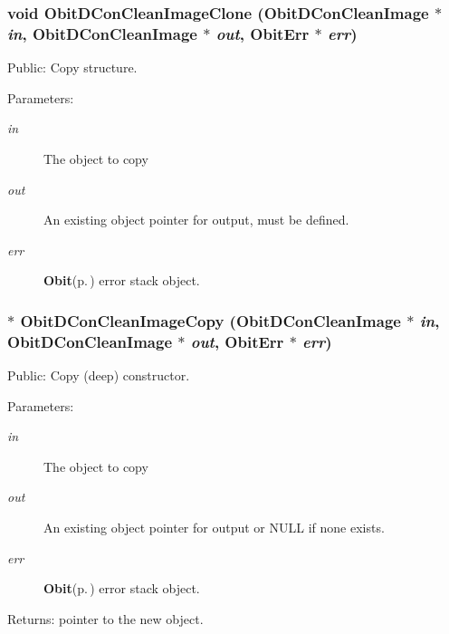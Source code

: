 \subsubsection{\setlength{\rightskip}{0pt plus 5cm}void Obit\-DCon\-Clean\-Image\-Clone ({\bf Obit\-DCon\-Clean\-Image} $\ast$ {\em in}, {\bf Obit\-DCon\-Clean\-Image} $\ast$ {\em out}, {\bf Obit\-Err} $\ast$ {\em err})}\label{ObitDConCleanImage_8c_a10}


Public: Copy structure. 

\begin{Desc}
\item[Parameters:]
\begin{description}
\item[{\em in}]The object to copy \item[{\em out}]An existing object pointer for output, must be defined. \item[{\em err}]{\bf Obit}{\rm (p.\,\pageref{structObit})} error stack object. \end{description}
\end{Desc}
\subsubsection{$\ast$ Obit\-DCon\-Clean\-Image\-Copy ({\bf Obit\-DCon\-Clean\-Image} $\ast$ {\em in}, {\bf Obit\-DCon\-Clean\-Image} $\ast$ {\em out}, {\bf Obit\-Err} $\ast$ {\em err})}\label{ObitDConCleanImage_8c_a9}


Public: Copy (deep) constructor. 

\begin{Desc}
\item[Parameters:]
\begin{description}
\item[{\em in}]The object to copy \item[{\em out}]An existing object pointer for output or NULL if none exists. \item[{\em err}]{\bf Obit}{\rm (p.\,\pageref{structObit})} error stack object. \end{description}
\end{Desc}
\begin{Desc}
\item[Returns:]pointer to the new object. \end{Desc}

